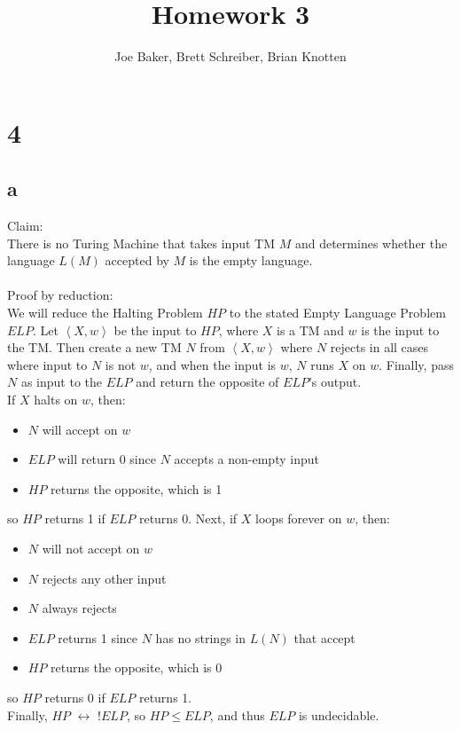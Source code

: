 \documentclass[letterpaper,notitlepage,twoside]{article}
\begin{document}
\title{Homework 3}
\author{Joe Baker, Brett Schreiber, Brian Knotten}
\maketitle

\section*{4}

\subsection*{a}
Claim:\\
There is no Turing Machine that takes input TM $M$ and determines whether the language $L(M)$ accepted by $M$ is the empty language.\\\\
Proof by reduction:\\
We will reduce the Halting Problem $HP$ to the stated Empty Language Problem $ELP$. Let $\left<X, w\right>$ be the input to $HP$, where $X$ is a TM and $w$ is the input to the TM. Then create a new TM $N$ from $\left<X, w\right>$ where $N$ rejects in all cases where input to $N$ is not $w$, and when the input is $w$, $N$ runs $X$ on $w$. Finally, pass $N$ as input to the $ELP$ and return the opposite of $ELP$'s output.\\
If $X$ halts on  $w$, then:
\begin{itemize}
\item $N$ will accept on $w$
\item $ELP$ will return 0 since $N$ accepts a non-empty input
\item $HP$ returns the opposite, which is 1
\end{itemize}
so $HP$ returns 1 if $ELP$ returns 0.
Next, if $X$ loops forever on $w$, then:
\begin{itemize}
\item $N$ will not accept on $w$
\item $N$ rejects any other input
\item $N$ always rejects
\item $ELP$ returns 1 since $N$ has no strings in $L(N)$ that accept
\item $HP$ returns the opposite, which is 0
\end{itemize}
so $HP$ returns 0 if $ELP$ returns 1.\\
Finally, $HP$ $\leftrightarrow$ $!ELP$, so $HP \le ELP$, and thus $ELP$ is undecidable.
\end{document}
